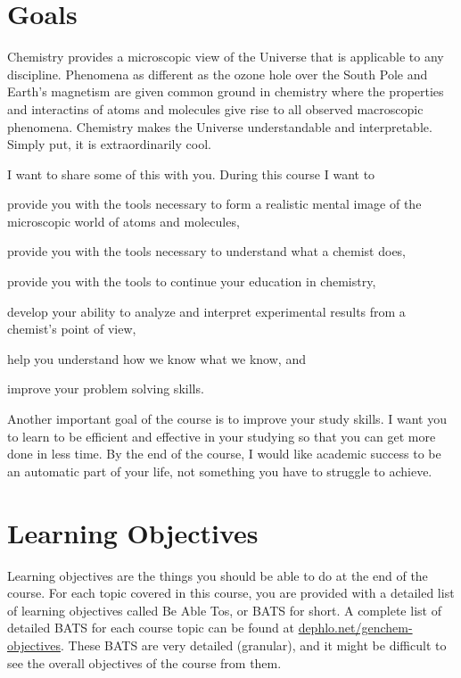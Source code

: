\documentclass[letterpaper,oneside,onecolumn,11pt,article]{memoir}
\begin{document}
\section{Goals}
Chemistry provides a microscopic view of the Universe that is applicable to any discipline. Phenomena as different as the ozone hole over the South Pole and Earth's magnetism are given common ground in chemistry where the properties and interactins of atoms and molecules give rise to all observed macroscopic phenomena. Chemistry makes the Universe understandable and interpretable. Simply put, it is extraordinarily cool. 

I want to share some of this with you. During this course I want to 
\begin{inparaenum}
\item provide you with the tools necessary to form a realistic mental image of the microscopic world of atoms and molecules,
\item provide you with the tools necessary to understand what a chemist does,
\item provide you with the tools to continue your education in chemistry,
\item develop your ability to analyze and interpret experimental results from a chemist's point of view,
\item help you understand how we know what we know, and
\item improve your problem solving skills.
\end{inparaenum}

Another important goal of the course is to improve your study skills. I want you to learn to be efficient and effective in your studying so that you can get more done in less time. By the end of the course, I would like academic success to be an automatic part of your life, not something you have to struggle to achieve. 
%
%
\section{Learning Objectives}
Learning objectives are the things you should be able to do at the end of the course. For each topic covered in this course, you are provided with a detailed list of learning objectives called Be Able Tos, or BATS for short. A complete list of detailed BATS for each course topic can be found at \href{http://dephlo.net/chem110/lecture/objectives}{dephlo.net/genchem-objectives}. These BATS are very detailed (granular), and it might be difficult to see the overall objectives of the course from them. 
\end{document}
